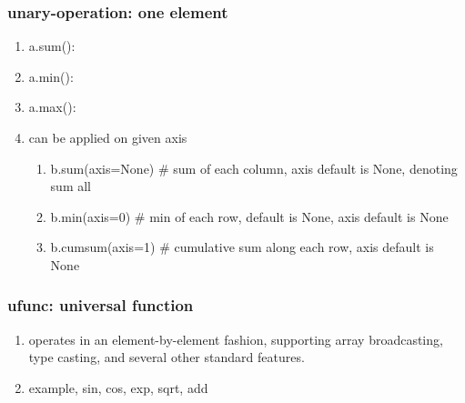 \documentclass[11pt]{article}
\begin{document}
\subsubsection{unary-operation: one element}
\label{sec:org46ed59f}
\begin{enumerate}
\item a.sum():
\label{sec:orgf2de8b8}
\item a.min():
\label{sec:org27ce998}
\item a.max():
\label{sec:orgda1828f}
\item can be applied on given axis
\label{sec:orgc8bea1a}
\begin{enumerate}
\item b.sum(axis=None) \# sum of each column, axis default is None, denoting sum all
\label{sec:orgc900a5f}
\item b.min(axis=0) \# min of each row, default is None, axis default is None
\label{sec:orgf6b376c}
\item b.cumsum(axis=1) \# cumulative sum along each row, axis default is None
\label{sec:orgdd59c61}
\end{enumerate}
\end{enumerate}
\subsubsection{ufunc: universal function}
\label{sec:orgc52b03a}
\begin{enumerate}
\item operates in an element-by-element fashion, supporting array broadcasting, type casting, and several other standard features.
\label{sec:orgb5c9016}
\item example, sin, cos, exp, sqrt, add
\label{sec:org3b69a4c}
\end{enumerate}
\end{document}
